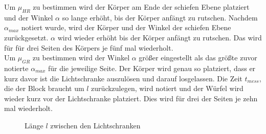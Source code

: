 Um $\mu_{HR}$ zu bestimmen wird der Körper am Ende der schiefen Ebene platziert und der Winkel $\alpha$ so lange erhöht, bis der Körper anfängt zu rutschen. Nachdem $\alpha_{max}$ notiert wurde, wird der Körper und der Winkel der schiefen Ebene zurückgesetzt. $\alpha$ wird wieder erhöht bis der Körper anfängt zu rutschen. Das wird für für drei Seiten des Körpers je fünf mal wiederholt.\\
Um $\mu_{GR}$ zu bestimmen wird der Winkel $\alpha$ größer eingestellt als das größte zuvor notierte $\alpha_{max}$ für die jeweilige Seite. Der Körper wird genau so platziert, dass er kurz davor ist die Lichtschranke auszulösen und darauf losgelassen. Die Zeit $t_{mess}$, die der Block braucht um $l$ zurückzulegen, wird notiert und der Würfel wird wieder kurz vor der Lichtschranke platziert. Dies wird für drei der Seiten je zehn mal wiederholt.

\begin{figure}
    \centering
    
    \caption[Lichtschranken]{Länge $l$ zwischen den Lichtschranken}
    \label{fig:Lichtschranken}
\end{figure}